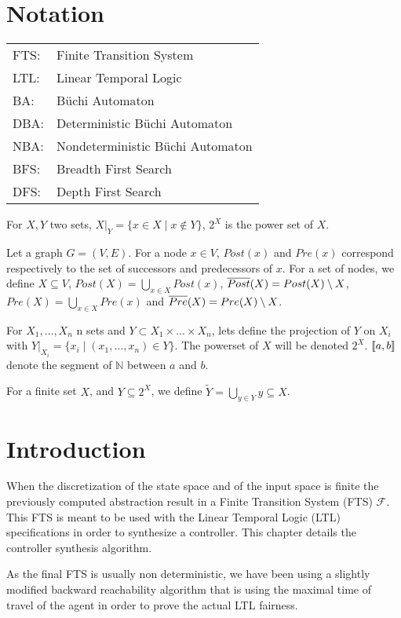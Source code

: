 \section*{Notation}
\begin{tabular}{ll}
FTS:& Finite Transition System\\
LTL:& Linear Temporal Logic\\
BA: & B\"uchi Automaton\\
DBA:& Deterministic B\"uchi Automaton\\
NBA:& Nondeterministic B\"uchi Automaton\\
BFS:& Breadth First Search\\
DFS:& Depth First Search\\
\end{tabular}

For $X,Y$ two sets, $X|_Y = \{x \in X \mid x \notin  Y \}$, $2^X$ is the power set of $X$.

Let a graph $G = (V,E)$.
For a node $x \in V$, $Post(x)$ and $Pre(x)$ correspond respectively to the set of successors and predecessors of $x$. 
For a set of nodes, we define $X \subseteq V$, $Post(X) = \bigcup_{x \in X} Post(x)$, $\overline{Post} (X) = Post(X) \setminus X$, $Pre(X) = \bigcup_{x \in X} Pre(x)$ and $\overline{Pre} (X) = Pre(X) \setminus X$.

For $X_1,\dots,X_n$ n sets and $Y \subset X_1 \times \dots \times X_n$, lets define the projection of $Y$ on $X_i$ with $Y|_{X_i} = \{x_i \mid (x_1,\dots,x_n) \in Y\}$.
The powerset of $X$ will be denoted $2^X$.
$\left \llbracket a,b \right \rrbracket$ denote the segment of $\mathbb{N}$ between $a$ and $b$.

For a finite set $X$, and $Y \subseteq 2^X$, we define $\tilde{Y} = \bigcup_{y\in Y} y \subseteq X$.

\section{Introduction}
\newcommand{\Aphi}{\mathcal{A}_\varphi}%
\newcommand{\Fts}{\mathcal{F}}%
When the discretization of the state space and of the input space is finite the previously computed abstraction result in a Finite Transition System (FTS) $\Fts$. This FTS is meant to be used with the Linear Temporal Logic (LTL) specifications in order to synthesize a controller. This chapter details the controller synthesis algorithm.

As the final FTS is usually non deterministic, we have been using a slightly modified backward reachability algorithm that is using the maximal time of travel of the agent in order to prove the actual LTL fairness.

